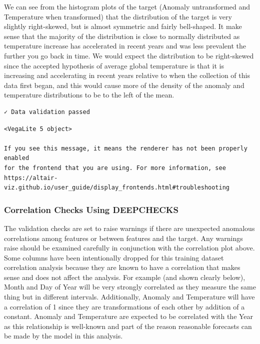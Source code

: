 \documentclass[
  letterpaper,
  DIV=11,
  numbers=noendperiod]{scrartcl}
\begin{document}
We can see from the histogram plots of the target (Anomaly untransformed
and Temperature when transformed) that the distribution of the target is
very slightly right-skewed, but is almost symmetric and fairly
bell-shaped. It make sense that the majority of the distribution is
close to normally distributed as temperature increase has accelerated in
recent years and was less prevalent the further you go back in time. We
would expect the distribution to be right-skewed since the accepted
hypothesis of average global temperature is that it is increasing and
accelerating in recent years relative to when the collection of this
data first began, and this would cause more of the density of the
anomaly and temperature distributions to be to the left of the mean.

\begin{verbatim}
✓ Data validation passed
\end{verbatim}

\begin{verbatim}
<VegaLite 5 object>

If you see this message, it means the renderer has not been properly enabled
for the frontend that you are using. For more information, see
https://altair-viz.github.io/user_guide/display_frontends.html#troubleshooting
\end{verbatim}

\subsubsection{Correlation Checks Using
DEEPCHECKS}\label{correlation-checks-using-deepchecks}

The validation checks are set to raise warnings if there are unexpected
anomalous correlations among features or between features and the
target. Any warnings raise should be examined carefully in conjunction
with the correlation plot above. Some columns have been intentionally
dropped for this training dataset correlation analysis because they are
known to have a correlation that makes sense and does not affect the
analysis. For example (and shown clearly below), Month and Day of Year
will be very strongly correlated as they measure the same thing but in
different intervals. Additionally, Anomaly and Temperature will have a
correlation of 1 since they are transformations of each other by
addition of a constant. Anomaly and Temperature are expected to be
correlated with the Year as this relationship is well-known and part of
the reason reasonable forecasts can be made by the model in this
analysis.
\end{document}
